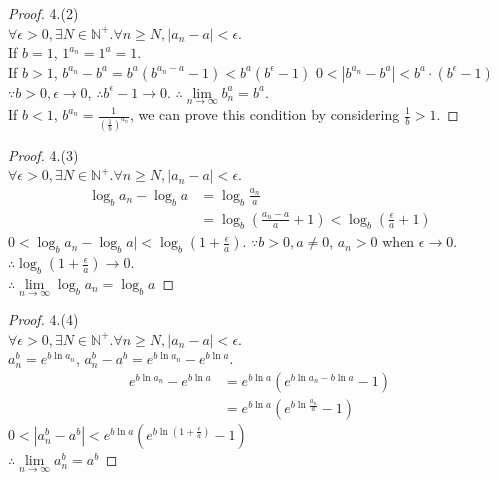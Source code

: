 \begin{proof}4.(2)\\
	$\forall \epsilon >0, \exists N \in \mathbb{N}^+. \forall n \geqslant N, |a_n-a| < \epsilon$.\\
	If $ b=1 $, $ 1^{a_n} =1^a = 1 $.\\
	If $ b>1 $, $ b^{a_n}-b^a = b^a(b^{a_n-a}-1)<b^a(b^\epsilon-1) $
	$ 0<|b^{a_n}-b^a|<b^a\cdot(b^\epsilon-1) $
	$ \because b>0, \epsilon\rightarrow 0 $, $ \therefore b^\epsilon-1 \rightarrow 0 $.
	$ \therefore \lim\limits_{n\rightarrow\infty}b^a_n = b^a $.\\
	If $ b<1 $, $ b^{a_n} = \frac{1}{(\frac{1}{b})^{a_n}} $, we can prove this condition by considering $ \frac{1}{b} >1 $.
\end{proof}


\begin{proof}4.(3)\\
	$\forall \epsilon >0, \exists N \in \mathbb{N}^+. \forall n \geqslant N, |a_n-a| < \epsilon$.\\
	\begin{align*}
		\log_{b}a_n-\log_{b}a
		&=\log_{b}\frac{a_n}{a}\\
		&=\log_{b}(\frac{a_n-a}{a}+1) < \log_{b}(\frac{\epsilon}{a}+1)
	\end{align*}
	$ 0<\log_{b}a_n-\log_{b}a|<\log_{b}(1+\frac{\epsilon}{a}) $.
	$ \because b>0, a\neq 0$,  $ a_n>0 $ when $ \epsilon\rightarrow0 $. $ \therefore \log_{b}(1+\frac{\epsilon}{a})\rightarrow0 $.\\
	$ \therefore \lim\limits_{n\rightarrow\infty}\log_{b}a_n=\log_{b}a $	
\end{proof} 

\begin{proof}4.(4)\\
	$\forall \epsilon >0, \exists N \in \mathbb{N}^+. \forall n \geqslant N, |a_n-a| < \epsilon$.\\
	$ a_n^b = e^{b\ln a_n} $, $ a_n^b-a^b = e^{b\ln a_n}-e^{b\ln a} $.
	\begin{align*}
			e^{b\ln a_n}-e^{b\ln a}
			&=e^{b\ln a}(e^{b\ln a_n-b\ln a}-1)\\
			&=e^{b\ln a}(e^{b\ln \frac{a_n}{a}}-1)
	\end{align*}
	$ 0 < |a_n^b-a^b| < e^{b\ln a}(e^{b\ln (1+\frac{\epsilon}{a})}-1) $\\
	$ \therefore \lim\limits_{n\rightarrow\infty}a_n^b = a^b $
\end{proof}


